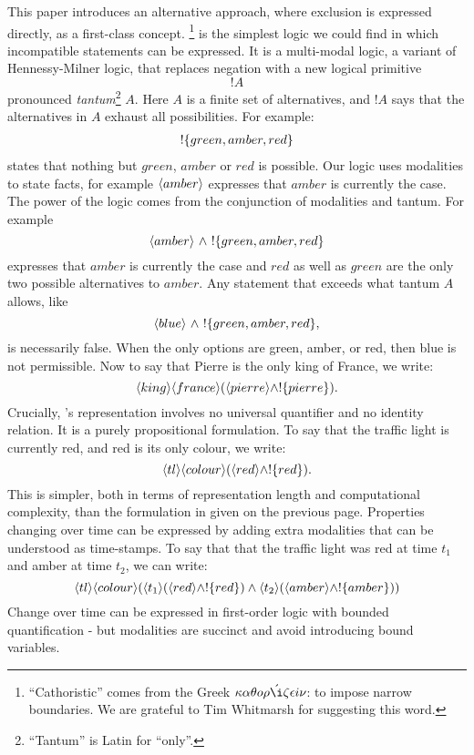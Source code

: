 This paper introduces an alternative approach, where
exclusion is expressed directly, as a first-class concept.
 \Cathoristic{}\footnote{``Cathoristic'' comes from the Greek
  $\kappa \alpha \theta o \rho \acute{\i} \zeta \epsilon i \nu$: to impose narrow
  boundaries. We are grateful to Tim Whitmarsh for suggesting this
  word.} is the simplest logic we could find in which incompatible
statements can be expressed.  
It is a multi-modal logic, a variant of Hennessy-Milner logic,
that replaces negation with a new logical primitive
\[
   !A
\]
pronounced \emph{tantum}\footnote{``Tantum'' is Latin for ``only''.}
$A$. Here $A$ is a finite set of alternatives, and $!A$ says that the
alternatives in $A$ exhaust all possibilities.  For example:
\begin{eqnarray*}
! \{green, amber, red\}
\end{eqnarray*}
states that nothing but $green$, $amber$ or $red$ is possible.  Our
logic uses modalities to state facts, for example $\langle amber \rangle$
expresses that $amber$ is currently the case.  The power of the logic
comes from the conjunction of modalities and tantum. For example
\[
   \langle amber \rangle\ \land\ !\{green, amber, red\} 
\]
expresses that $amber$ is currently the case and $red$ as well as
$green$ are the only two possible alternatives to $amber$.  Any
statement that exceeds what tantum $A$ allows, like
\[
   \langle blue \rangle \ \land\ !\{green, amber, red\},
\]
is necessarily false.  When the only options are green, amber, or red,
then blue is not permissible.  Now to say that Pierre is the only king
of France, we write:
\[
\langle king \rangle \langle france \rangle (\langle pierre \rangle \land ! \{pierre\}).
\]
Crucially, \cathoristic{}'s representation involves no
universal quantifier and no identity relation.  It is a purely
propositional formulation.  To say that the traffic
light is currently red, and red is its only colour, we write:
\[
\langle tl \rangle \langle colour \rangle (\langle red \rangle \land !\{red\}).
\]
This is simpler, both in terms of representation length and
computational complexity, than the formulation in \fol{} given on the
previous page.
Properties changing over time can be expressed by adding extra
modalities that can be understood as time-stamps.  To say that that
the traffic light was red at time $t_1$ and amber at time $t_2$, we
can write:
\[
   \langle tl \rangle \langle colour \rangle (\langle t_1 \rangle (\langle red \rangle \land !\{red\}) \land \langle t_2 \rangle (\langle amber \rangle \land !\{amber\}))
\]
Change over time can be expressed in first-order logic with bounded
quantification - but modalities are succinct and avoid introducing
bound variables.

